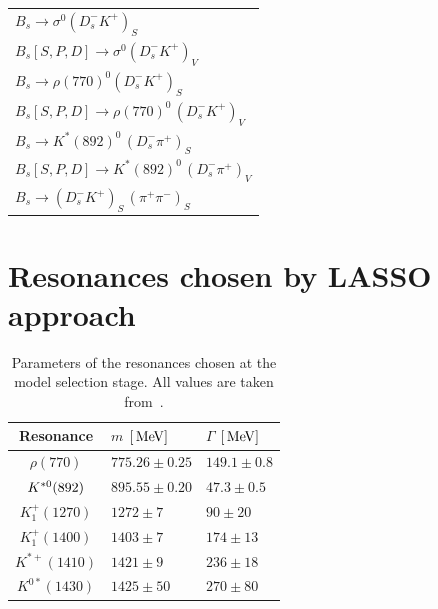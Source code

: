 \begin{table}[h]
\begin{tabular} {@{\hspace{0.5cm}}l@{\hspace{0.25cm}}}
              $B_s \to \sigma^{0} (D_s^- K^+)_S$ \\
              $B_s[S,P,D] \to \sigma^{0} (D_s^- K^+)_V$ \\
              $B_s \to \rho(770)^{0} (D_s^- K^+)_S$ \\
              $B_s[S,P,D] \to \rho(770)^{0} \, (D_s^- K^+)_V$\\
              $B_s \to  K^{*}(892)^{0} \, (D_s^- \pi^+)_S$ \\
              $B_s[S,P,D]  \to  K^{*}(892)^{0} \, (D_s^- \pi^+)_V$ \\
              $B_s \to (D_s^- K^+)_{S} \, (\pi^+ \pi^-)_{S}$ \\
              \hline \hline
           \end{tabular}
\end{table}


\clearpage\section{Resonances chosen by LASSO approach}
\label{a:ResoParas}


\begin{table}[h]
\centering
\caption{Parameters of the resonances chosen at the model selection stage. All values are taken from~\cite{PDG2016}.}
\hline \hline
\begin{tabular}{c || l | l }
Resonance & $m$ $[\mathrm{\,Me\kern -0.1em V}]$ & $\Gamma$ $[\mathrm{\,Me\kern -0.1em V}]$ \\
\hline
$\rho(770)$ & $775.26 \pm 0.25$ & $149.1 \pm 0.8$\\
${{K}^{*0}}(892)$ & $895.55 \pm 0.20$ & $47.3 \pm 0.5$\\
$K^{+}_{1}(1270)$ & $1272 \pm 7$ & $90 ± 20$\\
$K^{+}_{1}(1400)$ & $1403 \pm 7$ & $174 \pm 13$\\
$K^{*+}(1410)$ & $1421 \pm 9$ & $236 \pm 18$\\
$K^{0*}(1430)$ & $1425 \pm 50$ & $270 \pm 80$\\
\hline \hline
\end{tabular}
\end{table}
